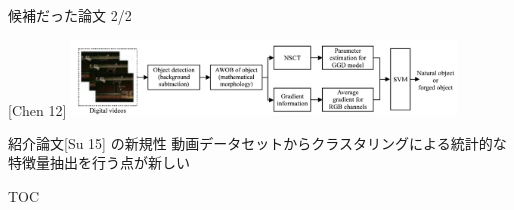 \begin{frame}{候補だった論文 2/2}
\begin{block}{[Chen 12]}
\includegraphics[height=2cm]{figure/chen0.png}
\end{block}

\begin{alertblock}{紹介論文[Su 15] の新規性}
動画データセットからクラスタリングによる統計的な特徴量抽出を行う点が新しい
\end{alertblock}
\end{frame}




\begin{frame}{TOC}
\tableofcontents
\end{frame}
